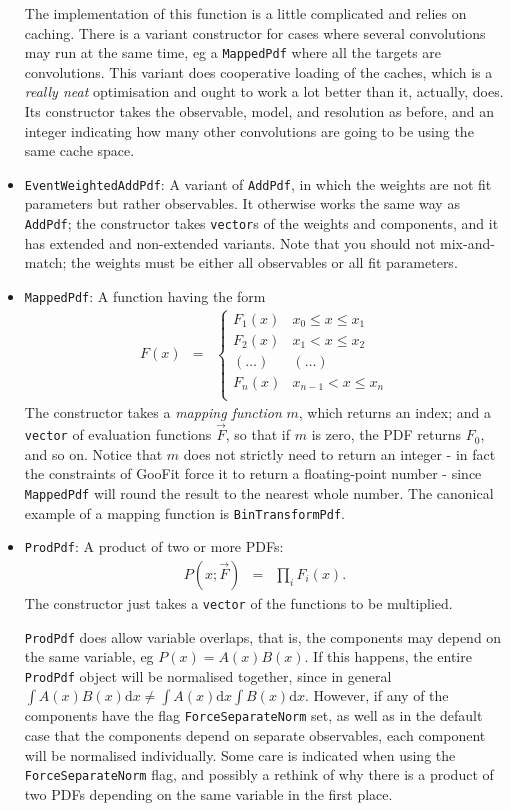 \documentclass[12pt,pdflatex]{article}
\begin{document}
\begin{itemize}
The implementation of this function is a little complicated and relies on caching.
There is a variant constructor for cases where several convolutions may run at the same
time, eg a \texttt{MappedPdf} where all the targets are convolutions. This
variant does cooperative loading of the caches, which is a \emph{really neat} optimisation
and ought to work a lot better than it, actually, does. Its constructor takes the observable, 
model, and resolution as before, and an integer indicating how many other convolutions are going
to be using the same cache space. 
\item \texttt{EventWeightedAddPdf}: A variant of \texttt{AddPdf}, 
in which the weights are not fit parameters but rather observables. It otherwise
works the same way as \texttt{AddPdf}; the constructor takes \texttt{vector}s
of the weights and components, and it has extended and non-extended variants. Note that
you should not mix-and-match; the weights must be either all observables or all fit parameters.
\item \texttt{MappedPdf}: A function having the form
\begin{eqnarray}
F(x) &=& \left\{ \begin{matrix}
F_1(x)   & x_0 \le x \le x_1 \\
F_2(x)   & x_1 < x \le x_2 \\
(\ldots) & (\ldots)        \\
F_n(x)   & x_{n-1} < x \le x_n \\
\end{matrix}
\right. 
\end{eqnarray}
The constructor takes a \emph{mapping function} $m$, which returns an index;
and a \texttt{vector} of evaluation functions $\vec F$, so that if $m$ is zero, 
the PDF returns $F_0$, and so on. Notice that $m$ does not strictly need to 
return an integer - in fact the constraints of GooFit force it to return a floating-point
number - since \texttt{MappedPdf} will round the result to the nearest
whole number. The canonical example of a mapping function is \texttt{BinTransformPdf}.
\item \texttt{ProdPdf}: A product of two or more PDFs:
\begin{eqnarray}
P(x; \vec F) &=& \prod\limits_i F_i(x).
\end{eqnarray}
The constructor just takes a \texttt{vector} of the functions to be multiplied. 

\texttt{ProdPdf} does allow variable overlaps, that is, the components
may depend on the same variable, eg $P(x) = A(x)B(x)$. If this happens, the entire
\texttt{ProdPdf} object will be normalised together, since in general
$\int A(x)B(x) \mathrm{d}x \ne \int A(x) \mathrm{d}x \int B(x) \mathrm{d}x$.
However, if any of the components have the flag \texttt{ForceSeparateNorm} set,
as well as in the default case that the components depend on separate observables, 
each component will be normalised individually. Some care is indicated
when using the \texttt{ForceSeparateNorm} flag, and possibly a rethink of why there
is a product of two PDFs depending on the same variable in the first place. 
\end{itemize}
\end{document}
